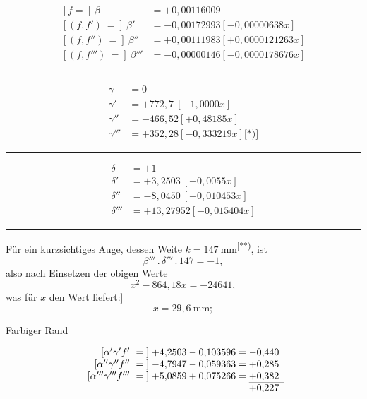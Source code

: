 \clearpage{}
\[
\begin{aligned}
[f={}]\ \beta&=+0{,}00116009\\
{}[(f,f')\ ={}]\ \beta'&=-0{,}00172993[-0{,}00000638x]\\
{}[(f,f'')\ ={}]\ \beta''&=+0{,}00111983[+0{,}0000121263x]\\
{}[(f,f''')\ ={}]\ \beta'''&=-0{,}00000146[-0{,}0000178676x]
\end{aligned}
\]
\noindent\rule{\linewidth}{.4pt}
\[
\begin{aligned}
\gamma&=0\\
\gamma'&=+772{,}7\ [-1{,}0000x]\\
\gamma''&=-466{,}52[+0{,}48185x]\\
\gamma'''&=+352{,}28[-0{,}333219x]\text{[*)]}
\end{aligned}
\]
\begingroup\renewcommand{\thefootnote}{}\endgroup
\noindent\rule{\linewidth}{.4pt}
\[
\begin{aligned}
\delta&=+1\\
\delta'&=+3{,}2503\ [-0{,}0055x]\\
\delta''&=-8{,}0450\ [+0{,}010453x]\\
\delta'''&=+13{,}27952[-0{,}015404x]
\end{aligned}
\]
\noindent\rule{\linewidth}{.4pt}\par\medskip
Für ein kurzsichtiges Auge, dessen Weite $k=147\ \mathrm{mm}$\textsuperscript{[**)}, ist
\begingroup\renewcommand{\thefootnote}{}\endgroup
\[
\beta'''\mathbin{.}\delta'''\mathbin{.}147=-1,
\]
\noindent also nach Einsetzen der obigen Werte
\[
x^2-864{,}18x=-24641,
\]
\noindent was für $x$ den Wert liefert:]
\[
x=29{,}6\ \mathrm{mm};
\]
\begin{center}Farbiger Rand\end{center}
\[
\begin{array}{r@{\;}r@{\;}r@{\;}r}
[\alpha'\gamma'f'\ ={}]&+4{,}2503-0{,}103596&=&-0{,}440\\
{}[\alpha''\gamma''f''\ ={}]&-4{,}7947-0{,}059363&=&+0{,}285\\
{}[\alpha'''\gamma'''f'''\ ={}]&+5{,}0859+0{,}075266&=&+0{,}382\\\cline{4-4}
&&&+0{,}227
\end{array}
\]

